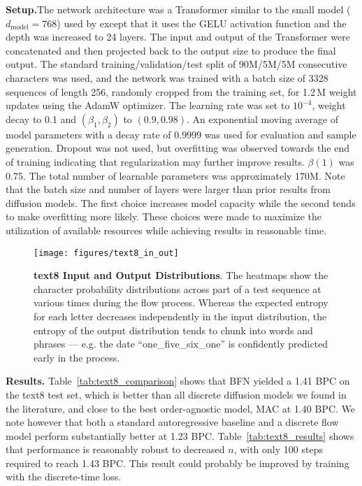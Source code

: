 \documentclass[11pt,table]{article}
\newcommand{\0}[1]{\constvec{0}{#1}}
\newcommand{\1}[1]{\constvec{1}{#1}}
\begin{document}
\noindent\textbf{Setup.}\quad The network architecture was a Transformer similar to the small model ($d_{\text{model}}=768$) used by \citet{radford2019language} except that it uses the GELU activation function \citep{hendrycks2016gaussian} and the depth was increased to 24 layers.
The input and output of the Transformer were concatenated and then projected back to the output size to produce the final output.
The standard training/validation/test split of 90M/5M/5M consecutive characters was used, and
the network was trained with a batch size of 3328 sequences of length 256, randomly cropped from the training set, for 1.2\,M weight updates using the AdamW optimizer\citep{loshchilov2017decoupled}. 
The learning rate was set to $10^{-4}$, weight decay to 0.1 and $(\beta_1, \beta_2)$ to $ (0.9, 0.98)$.
An exponential moving average of model parameters with a decay rate of 0.9999 was used for evaluation and sample generation.
Dropout was not used, but overfitting was observed towards the end of training indicating that regularization may further improve results.
$\beta(1)$ was 0.75.
The total number of learnable parameters was approximately 170M.
Note that the  batch size and number of layers were larger than prior results from diffusion models. 
The first choice increases model capacity while the second tends to make overfitting more likely.
These choices were made to maximize the utilization of available resources while achieving results in reasonable time.
\\

\begin{figure}[t!]
\centering
\texttt{[image: figures/text8\_in\_out]}
\caption{\textbf{text8 Input and Output Distributions}. The heatmaps show the character probability distributions across part of a test sequence at various times during the flow process. Whereas the expected entropy for each letter decreases independently in the input distribution, the entropy of the output distribution tends to chunk into words and phrases --- e.g. the date ``one\_five\_six\_one'' is confidently predicted early in the process.}
\end{figure}

\noindent\textbf{Results.}\quad
Table~\ref{tab:text8_comparison} shows that BFN yielded a  1.41 BPC on the text8 test set, which is better than all discrete diffusion models we found in the literature, and close to the best order-agnostic model, MAC at 1.40 BPC.
We note however that both a standard autoregressive baseline and a discrete flow model perform substantially better at 1.23 BPC.
Table~\ref{tab:text8_results} shows that performance is reasonably robust to decreased $n$, with only 100 steps required to reach 1.43 BPC.
This result could probably be improved by training with the discrete-time loss.
\end{document}
